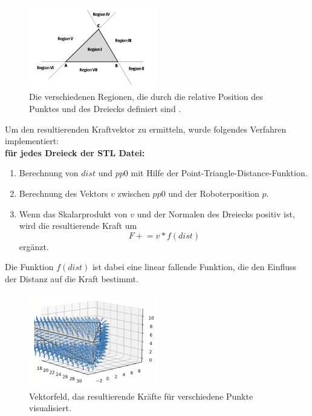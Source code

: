 \documentclass[conference]{IEEEtran}
\begin{document}
\begin{figure}[h]
    \centering
    \includegraphics[width=0.5\textwidth]{pics/regions.png}
    \caption{Die verschiedenen Regionen, die durch die relative Position des Punktes und des 
    Dreiecks definiert sind \cite{regionen}.}
    \label{fig:regions}
\end{figure}
\begin{samepage}
    Um den resultierenden Kraftvektor zu ermitteln, wurde folgendes Verfahren implementiert: \\
    \textbf{für jedes Dreieck der STL Datei:}
    \begin{enumerate}
        \item Berechnung von $dist$ und $pp0$ mit Hilfe der Point-Triangle-Distance-Funktion.
        \item Berechnung des Vektors $v$ zwischen $pp0$ und der Roboterposition $p$.
        \item Wenn das Skalarprodukt von $v$ und der Normalen des Dreiecks positiv ist, wird die 
        resultierende Kraft um
        \begin{equation*}
            F \mathrel{+}= v * f(dist)
        \end{equation*}
        ergänzt. 
    \end{enumerate}
    Die Funktion $f(dist)$ ist dabei eine linear fallende Funktion, die den Einfluss der Distanz 
    auf die Kraft bestimmt.
\end{samepage}

\begin{figure}[h]
    \centering
    \includegraphics[width=0.5\textwidth]{pics/vectorfield.png}
    \caption{Vektorfeld, das resultierende Kräfte für verschiedene Punkte visualisiert.}
    \label{fig:vectorfield}
\end{figure}
\end{document}
